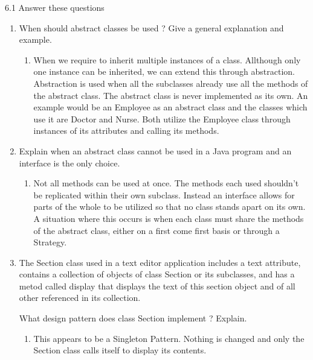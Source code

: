	
6.1 Answer these questions

\begin{enumerate}[label=(\alph*),align=left, wide, labelwidth=!, labelindent=0pt]
\item When should abstract classes be used ?  Give a general explanation and example.

\begin{enumerate}[leftmargin = 1cm, rightmargin = 1cm]
\item[]  When we require to inherit multiple instances of a class.  Allthough only one instance can be inherited, we can extend this through abstraction.  Abstraction is used when all the subclasses already use all the methods of the abstract class.  The abstract class is never implemented as its own.  An example would be an Employee as an abstract class and the classes which use it are Doctor and Nurse.  Both utilize the Employee class through instances of its attributes and calling its methods.  
  		
\end{enumerate}

\item Explain when an abstract class cannot be used in a Java program and an interface is the only choice.

\begin{enumerate}[leftmargin = 1cm, rightmargin = 1cm]
\item[]  Not all methods can be used at once.  The methods each used shouldn't be replicated within their own subclass.  Instead an interface allows for parts of the whole to be utilized so that no class stands apart on its own.  A situation where this occurs is when each class must share the methods of the abstract class, either on a first come first basis or through a Strategy.  
  		
\end{enumerate}

\item The Section class used in a text editor application includes a text attribute, contains a collection of objects of class Section or its subclasses, and has a metod called display that displays the text of this section object and of all other referenced in its collection.

What design pattern does class Section implement ? Explain.

\begin{enumerate}[leftmargin = 1cm, rightmargin = 1cm]
\item[]  This appears to be a Singleton Pattern.  Nothing is changed and only the Section class calls itself to display its contents.
  		
\end{enumerate}

\end{enumerate}





